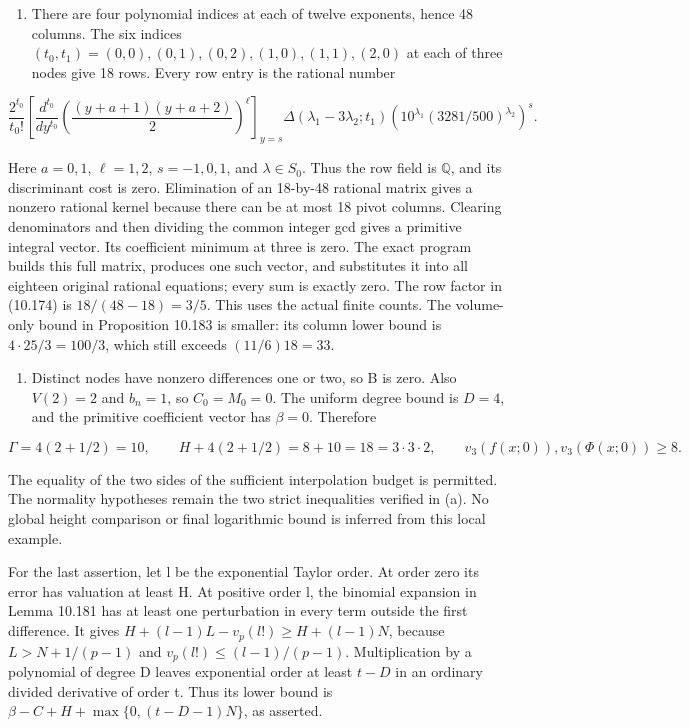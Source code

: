 \documentclass[
  11pt,
  a4paper,
]{article}
\providecommand{\tightlist}{%
  \setlength{\itemsep}{0pt}\setlength{\parskip}{0pt}}
\begin{document}
\begin{enumerate}
\def\labelenumi{(\alph{enumi})}
\setcounter{enumi}{1}
\tightlist
\item
  There are four polynomial indices at each of twelve exponents, hence
  48 columns. The six indices
  \((t_0,t_1)=(0,0),(0,1),(0,2),(1,0),(1,1),(2,0)\) at each of three
  nodes give 18 rows. Every row entry is the rational number
\end{enumerate}

\[
\frac{2^{t_0}}{t_0!}
 \left[\frac{d^{t_0}}{dy^{t_0}}
  \left(\frac{(y+a+1)(y+a+2)}2\right)^\ell\right]_{y=s}
 \Delta(\lambda_1-3\lambda_2;t_1)
 \left(10^{\lambda_1}(3281/500)^{\lambda_2}\right)^s.
\tag{10.698}
\]

Here \(a=0,1\), \(\ell=1,2\), \(s=-1,0,1\), and \(\lambda\in S_0\). Thus
the row field is \(\mathbb Q\), and its discriminant cost is zero.
Elimination of an 18-by-48 rational matrix gives a nonzero rational
kernel because there can be at most 18 pivot columns. Clearing
denominators and then dividing the common integer gcd gives a primitive
integral vector. Its coefficient minimum at three is zero. The exact
program builds this full matrix, produces one such vector, and
substitutes it into all eighteen original rational equations; every sum
is exactly zero. The row factor in (10.174) is \(18/(48-18)=3/5\). This
uses the actual finite counts. The volume-only bound in Proposition
10.183 is smaller: its column lower bound is \(4\cdot25/3=100/3\), which
still exceeds \((11/6)18=33\).

\begin{enumerate}
\def\labelenumi{(\alph{enumi})}
\setcounter{enumi}{2}
\tightlist
\item
  Distinct nodes have nonzero differences one or two, so B is zero. Also
  \(V(2)=2\) and \(b_n=1\), so \(C_0=M_0=0\). The uniform degree bound
  is \(D=4\), and the primitive coefficient vector has \(\beta=0\).
  Therefore
\end{enumerate}

\[
\Gamma=4(2+1/2)=10,\qquad
H+4(2+1/2)=8+10=18=3\cdot3\cdot2,
\qquad v_3(f(x;0)),v_3(\Phi(x;0))\ge8.
\tag{10.699}
\]

The equality of the two sides of the sufficient interpolation budget is
permitted. The normality hypotheses remain the two strict inequalities
verified in (a). No global height comparison or final logarithmic bound
is inferred from this local example.

For the last assertion, let l be the exponential Taylor order. At order
zero its error has valuation at least H. At positive order l, the
binomial expansion in Lemma 10.181 has at least one perturbation in
every term outside the first difference. It gives
\(H+(l-1)L-v_p(l!)\ge H+(l-1)N\), because \(L>N+1/(p-1)\) and
\(v_p(l!)\le(l-1)/(p-1)\). Multiplication by a polynomial of degree D
leaves exponential order at least \(t-D\) in an ordinary divided
derivative of order t. Thus its lower bound is
\(\beta-C+H+\max\{0,(t-D-1)N\}\), as asserted.
\end{document}
